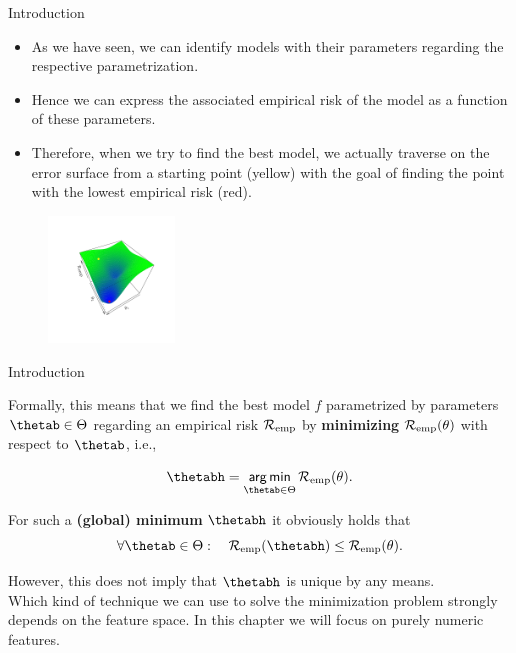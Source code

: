 \documentclass[11pt,compress,t,notes=noshow, xcolor=table]{beamer}
\begin{document}
\begin{vbframe}{Introduction}
\begin{itemize}
\item As we have seen, we can identify models with their parameters regarding the respective parametrization. 
\item Hence we can express the associated empirical risk of the model as a function of these parameters.
\item Therefore, when we try to find the best model, we actually traverse on the error surface from a starting point (yellow) with the goal of finding the point with the lowest empirical risk (red).
\end{itemize}
\begin{center}
\begin{figure}[!b]
\includegraphics[trim=2.4cm 2.4cm 2.4cm 2.4cm, width=0.3\textwidth]{figure/err_surf}
\end{figure}
\end{center}

\end{vbframe}
\begin{vbframe}{Introduction}

Formally, this means that we find the best model $f$ parametrized by parameters $\thetab \in \Theta$ regarding an empirical risk $\mathcal{R}_{\text{emp}}$ by \textbf{minimizing} $\mathcal{R}_{\text{emp}}(\theta)$ with respect to $\thetab$, i.e., 

\[
\thetabh  = \argmin_{\thetab \in \Theta} \risket .
\]

For such a \textbf{(global) minimum} $\thetabh$ it obviously holds that 
\[
\forall \thetab \in \Theta :\quad \riske(\thetabh) \leq \risket .
\]

However, this does not imply that $\thetabh$ is unique by any means. \\
\lz
Which kind of technique we can use to solve the minimization problem strongly depends on the feature space. In this chapter we will focus on purely numeric features.

\end{vbframe}
\end{document}
